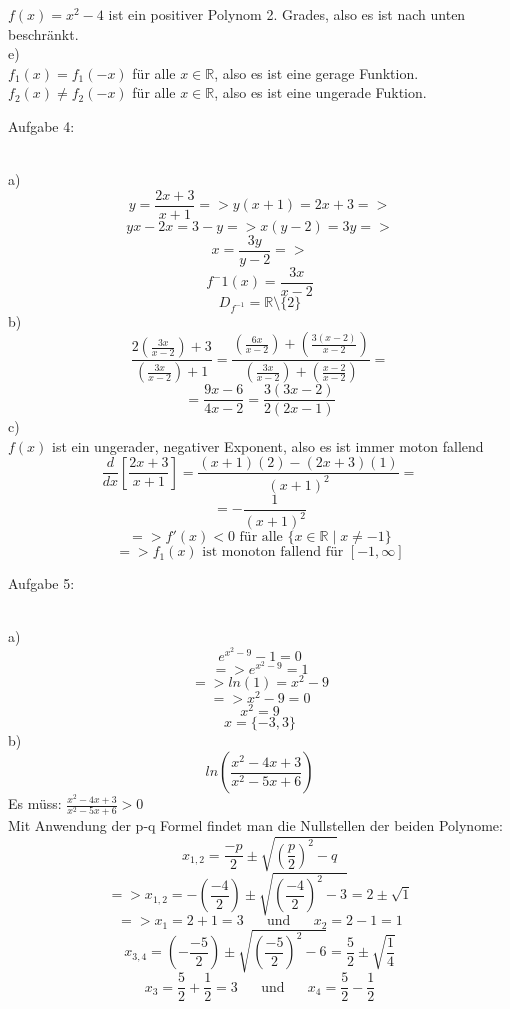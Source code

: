 \documentclass[11pt]{article}
\begin{document}
			$f(x)=x^2-4$ ist ein positiver Polynom 2. Grades, also es ist nach unten beschränkt.\\
			\indent e)\\
				$f_1(x)=f_1(-x)$ für alle $x\in\mathbb{R}$, also es ist eine gerage Funktion.\\
				$f_2(x) \neq f_2(-x)$ für alle $x\in\mathbb{R}$, also es ist eine ungerade Fuktion.\\
		\noindent \begin{Large}Aufgabe 4:\end{Large}\\[2pt]
			\indent a)
				$$y=\frac{2x+3}{x+1} => y(x+1)=2x+3=>$$
				$$yx-2x=3-y => x(y-2)=3y=>$$
				$$x=\frac{3y}{y-2}=>$$
				$$f^-1(x)=\frac{3x}{x-2}$$
				$$D_{f^{-1}}=\mathbb{R}\setminus\{2\}$$
			\indent b)
				$$\frac{2\left(\frac{3x}{x-2}\right)+3}{\left(\frac{3x}{x-2}\right)+1}=\frac{\left(\frac{6x}{x-2}\right)+\left(\frac{3(x-2)}{x-2}\right)}{\left(\frac{3x}{x-2}\right)+\left(\frac{x-2}{x-2}\right)}=$$
				$$=\frac{9x-6}{4x-2}=\frac{3(3x-2)}{2(2x-1)}$$
			\indent c)\\
				$f(x)$ ist ein ungerader, negativer Exponent, also es ist immer moton fallend\\
				$$\frac{d}{dx}\left[\frac{2x+3}{x+1}\right]=\frac{(x+1)(2)-(2x+3)(1)}{(x+1)^2}=$$
				$$=-\frac{1}{(x+1)^2}$$
				$$=> f'(x)<0  \mbox{ für alle } \{x \in \mathbb{R} \mid x \neq -1\}$$
				$$=> f_1(x) \mbox{ ist monoton fallend  für }[-1,\infty] $$		
		\noindent \begin{Large}Aufgabe 5:\end{Large}\\[2pt]
			\indent a)
				$$e^{x^2-9}-1=0$$
				$$=> e^{x^2-9}=1$$
				$$=>ln(1)=x^2-9$$
				$$=>x^2-9=0$$
				$$x^2=9$$
				$$x=\{-3,3\}$$
			\indent b)
						$$ln\left(\frac{x^2-4x+3}{x^2-5x+6}\right)$$
						Es müss: $\frac{x^2-4x+3}{x^2-5x+6} >0$\\
						Mit Anwendung der p-q Formel findet man die Nullstellen der beiden Polynome:\\
						$$x_{1,2}=\frac{-p}{2}\pm \sqrt{\left(\frac{p}{2}\right)^2-q}$$
						$$=>x_{1,2}=-\left(\frac{-4}{2}\right)\pm \sqrt{\left(\frac{-4}{2}\right)^2-3}=2 \pm \sqrt{1}$$
						$$=>x_1 = 2+1=3 \hspace{20pt}\mbox{und}\hspace{20pt} x_2 = 2-1=1$$
						$$x_{3,4}=\left(-\frac{-5}{2}\right)\pm \sqrt{\left(\frac{-5}{2}\right)^2-6}= \frac{5}{2} \pm \sqrt{\frac{1}{4}}$$
						$$x_3=\frac{5}{2}+\frac{1}{2}=3 \hspace{20pt}\mbox{und}\hspace{20pt} x_4=\frac{5}{2}-\frac{1}{2}$$
\end{document}
